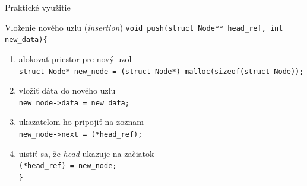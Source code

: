 \documentclass[slovak, 11pt]{beamer}
\begin{document}
\begin{frame}[fragile]{Praktické využitie}
    \begin{exampleblock}{Vloženie nového uzlu (\emph{insertion})}
        \verb|void push(struct Node** head_ref, int new_data){| \\
        \begin{enumerate}
            \item {\color{red!70!black}alokovať priestor pre nový uzol}\\
            {\footnotesize\verb|struct Node* new_node = (struct Node*) malloc(sizeof(struct Node));|}
            \item {\color{red!70!black}vložiť dáta do nového uzlu}\\
            \verb|new_node->data = new_data;|
            \item {\color{red!70!black}ukazateľom ho pripojiť na zoznam}\\
            \verb|new_node->next = (*head_ref);|
            \item {\color{red!70!black}uistiť sa, že \emph{head} ukazuje na začiatok}\\
            \verb|(*head_ref) = new_node;|\\
            \verb|}|
        \end{enumerate}
    \end{exampleblock}
\end{frame}

\end{document}
